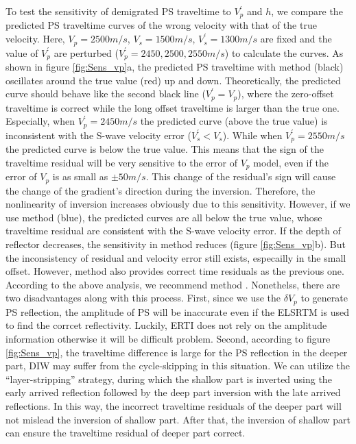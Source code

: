 To
test the sensitivity of demigrated PS traveltime to $V^{'}_p$ and $h$, we compare the predicted PS traveltime
curves of the wrong velocity with that of the true velocity.
Here, $V_p=2500m/s$, $V_s=1500m/s$, $V^{'}_s=1300m/s$ are fixed and the value of $V^{'}_p$
are perturbed ($V^{'}_p=2450, 2500, 2550m/s$) to calculate the curves.
As shown in figure \ref{fig:Sens_vp}a, the predicted PS traveltime with method
 (black) oscillates around the true value (red) up and down. 
Theoretically, the predicted
curve should behave like the second black line ($V^{'}_p=V_p$), where the zero-offset traveltime is correct while
the long offset traveltime is larger than the true one. Especially, when $V^{'}_p=2450m/s$ the
predicted curve (above the true value) is inconsistent with the S-wave velocity error
($V^{'}_s<V_s$). While when $V^{'}_p=2550m/s$ the predicted curve is below the true value. 
This means that the sign of the traveltime residual will be very sensitive to the error of $V_p$ model,  
even if the error of $V_p$ is as small as $\pm50m/s$. This change of the residual's sign will cause
the change of the gradient's direction during the inversion. Therefore, the nonlinearity of
inversion increases obviously due to this sensitivity. However, if we use method  (blue),
the predicted curves are all below the true value, whose traveltime residual are consistent
with the S-wave velocity error.
If the depth of reflector decreases, the sensitivity in method  reduces (figure \ref{fig:Sens_vp}b). But the
inconsistency of residual and velocity error still exists, especailly in the small offset.
However,
method  also provides correct time residuals as the previous one.
According to the above analysis, we recommend method .
Nonethelss, there are two disadvantages along with this process. First, since we use the $\delta
V_p$ to generate PS reflection, the amplitude of PS will be inaccurate even if the ELSRTM is used to
find the corrcet reflectivity. Luckily, ERTI does not rely on the amplitude information otherwise it
will be difficult problem. Second, according to figure \ref{fig:Sens_vp}, the traveltime difference
is large for the PS reflection in the deeper part, DIW may suffer from the cycle-skipping in this
situation. We can utilize the ``layer-stripping'' strategy, during which the shallow part is
inverted using the early arrived reflection followed by the deep part inversion with the late
arrived reflections. In this way, the incorrect traveltime residuals of the deeper part will not
mislead the inversion of shallow part. After that, the inversion of shallow part can ensure
the traveltime residual of deeper part correct.

